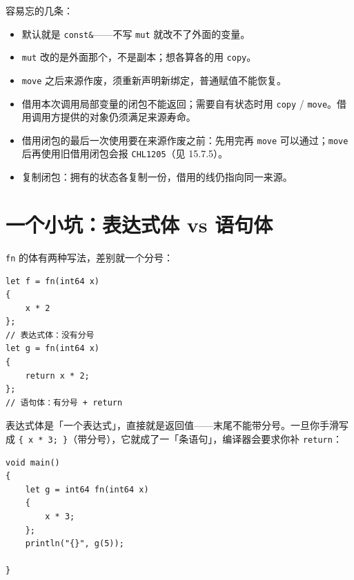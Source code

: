 容易忘的几条：

\begin{itemize}

\item 默认就是 \texttt{const\&}——不写 \texttt{mut} 就改不了外面的变量。

\item \texttt{mut} 改的是外面那个，不是副本；想各算各的用 \texttt{copy}。

\item \texttt{move} 之后来源作废，须重新声明新绑定，普通赋值不能恢复。

\item 借用本次调用局部变量的闭包不能返回；需要自有状态时用 \texttt{copy} / \texttt{move}。借用调用方提供的对象仍须满足来源寿命。

\item 借用闭包的最后一次使用要在来源作废之前：先用完再 \texttt{move} 可以通过；\texttt{move} 后再使用旧借用闭包会报 \texttt{CHL1205}（见 15.7.5）。

\item 复制闭包：拥有的状态各复制一份，借用的线仍指向同一来源。

\end{itemize}

\section{一个小坑：表达式体 vs 语句体}

\texttt{fn} 的体有两种写法，差别就一个分号：

\par
\medskip
\begin{lstlisting}[style=chali]
let f = fn(int64 x)
{
    x * 2
};
// 表达式体：没有分号
let g = fn(int64 x)
{
    return x * 2;
};
// 语句体：有分号 + return
\end{lstlisting}
\par
\medskip

表达式体是「一个表达式」，直接就是返回值——末尾不能带分号。一旦你手滑写成 \texttt{\{ x * 3; \}}（带分号），它就成了一「条语句」，编译器会要求你补 \texttt{return}：

\par
\medskip
\begin{lstlisting}[style=chali]
void main()
{
    let g = int64 fn(int64 x)
    {
        x * 3;
    };
    println("{}", g(5));

}
\end{lstlisting}
\par
\medskip

